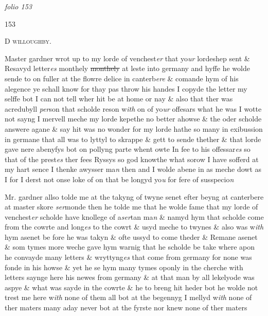 \documentclass[12pt, a4paper]{book}
\begin{document}
\textit{folio 153}



\begin{flushright}{\color{Mahogany}153}\end{flushright}
 
				\begin{center} \begin{large} {\scshape D willoughby.} \end{large} \end{center}
			
            		
		\ifthenelse{\isodd{\thepage}}
		{\reversemarginpar}
		{\normalmarginpar}
		Master gardner wrot up to my lorde of venchest\textit{er} that yo\textit{ur} lordeshep
 sent \& Resavyd letter\textit{es} monthely \sout{monthely} at leste into germany
            			and hyffe he wolde sende to on fuller at the flowre delice in canterb\textit{ere}
 \& comande hym of his alegence ye schall know for thay pas
 throw his handes I copyde the letter my selffe bot I can not
 tell wher hit be at home or nay \& also that ther was acredubyll
 \textit{per}son that scholde reson w\textit{ith} on of yo\textit{ur} offesars what he was I wotte
 not sayng I mervell meche my lorde kepethe no better ahowse
 \& the oder scholde answere agane \& say hit was no wonder
 for my lorde hathe so many in exibussion in germane that
 all was to lyttyl to skrappe \& gett to sende thether \& that
 lorde gave nere abenyfys bot on pollyng parte whent owte
 In fee to his offessar\textit{es} so that of the prest\textit{es} ther fees Ryssys
 so god knowthe what sorow I have sofferd at my hart sence
 I thenke awysser ma\textit{n} then and I wolde abene in as meche dowt
 as I for I derst not onse loke of on that be longyd yo\textit{u} for
 fere of susspecio\textit{n}
			
            		
		\ifthenelse{\isodd{\thepage}}
		{\reversemarginpar}
		{\normalmarginpar}
		Mr. gardner allso tolde me at the takyng of twyne senet
 efter beyng at canterbere at master skore \textit{ser}monde then
            			he tolde me that he wolde fame that my lorde of venchest\textit{er}
 scholde have knollege of a\textit{ser}tan ma\textit{n} \& namyd hym that scholde
 come from the cowrte and long\textit{es} to the cowrt \& usyd meche
 to twynes \& also was w\textit{ith} hym asenet be fore he was takyn
 \& ofte ussyd to come theder \& Remane asenet \& som tymes
 more weche gave hym warnig that he scholde be take where
 apon he convayde many letters \& wryttyng\textit{es} that come
 from germany for none was fonde in his howse \& yet he
 se hym
			 many tymes oponly in the cherche with letters saynge here
 his newes from germany \& at that man by all lekelyode
 was aspye \& what was sayde in the cowrte \& he to breng hit
 heder bot he wolde not trest me here w\textit{ith} none of them all bot
 at the begennyg I mellyd w\textit{ith} none of ther maters many aday
 never bot at the fyrste nor knew none of ther maters
\end{document}
